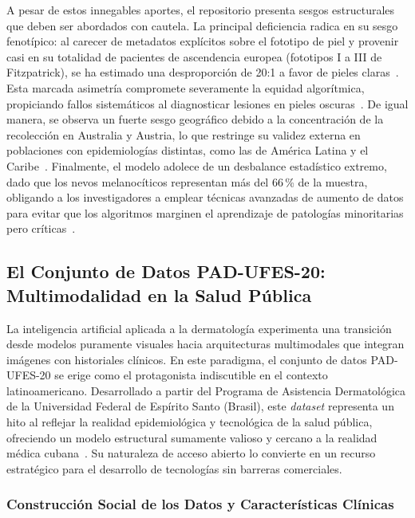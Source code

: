 A pesar de estos innegables aportes, el repositorio presenta sesgos estructurales que deben ser abordados 
con cautela. La principal deficiencia radica en su sesgo fenotípico: al carecer de metadatos explícitos 
sobre el fototipo de piel y provenir casi en su totalidad de pacientes de ascendencia 
europea (fototipos I a III de Fitzpatrick), se ha estimado una desproporción de 20:1 a favor de pieles 
claras~\cite{iccs_bias_derm}. Esta marcada asimetría compromete severamente la equidad algorítmica, propiciando fallos 
sistemáticos al diagnosticar lesiones en pieles oscuras~\cite{iccs_bias_derm}. De igual manera, se 
observa un fuerte sesgo geográfico debido a la concentración de la recolección en Australia y Austria, 
lo que restringe su validez externa en poblaciones con epidemiologías distintas, como las de América Latina 
y el Caribe~\cite{pmc_ham10000}. Finalmente, el modelo adolece de un desbalance estadístico extremo, 
dado que los nevos melanocíticos representan más del 66\,\% de la muestra, obligando a los investigadores 
a emplear técnicas avanzadas de aumento de datos para evitar que los algoritmos marginen el aprendizaje 
de patologías minoritarias pero críticas~\cite{pmc_ham10000}.


\subsection{El Conjunto de Datos PAD-UFES-20: Multimodalidad en la Salud Pública}\label{sec:pad-ufes}

La inteligencia artificial aplicada a la dermatología experimenta una transición desde modelos puramente 
visuales hacia arquitecturas multimodales que integran imágenes con historiales clínicos. 
En este paradigma, el conjunto de datos PAD-UFES-20 se erige como el protagonista indiscutible en el 
contexto latinoamericano. Desarrollado a partir del Programa de Asistencia Dermatológica de la Universidad 
Federal de Espírito Santo (Brasil), este \textit{dataset} representa un hito al reflejar la realidad 
epidemiológica y tecnológica de la salud pública, ofreciendo un modelo estructural sumamente valioso y 
cercano a la realidad médica cubana~\cite{isic_padufes,pmc_padufes}. Su naturaleza de acceso 
abierto lo convierte en un recurso estratégico para el desarrollo de tecnologías sin barreras comerciales.

\subsubsection{Construcción Social de los Datos y Características Clínicas}

